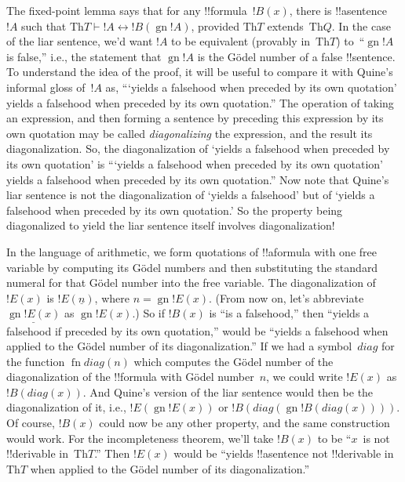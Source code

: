 \documentclass[10pt,a4paper]{article}
\theoremstyle{plain}
\theoremstyle{definition}
\theoremstyle{remark}
\newenvironment{explain}{}{}
\providecommand{\Proves}{\mathrel{\vdash}}
\providecommand{\Obj}{}
\providecommand{\Th}{\ensuremath{\mathrm{Th}}}
\providecommand{\num}[1]{\underline{#1}}
\providecommand{\Gn}{\operatorname{gn}}
\providecommand{\gn}{\operatorname{gn}}
\providecommand{\liff}{\mathbin{\leftrightarrow}}
\providecommand{\fn}{\operatorname{fn}}
\providecommand{\fn}{\operatorname{fn}}
\begin{document}
\begin{explain}
The fixed-point lemma says that for any !!{formula}~$!B(x)$, there is
!!a{sentence}~$!A$ such that $\Th{T} \Proves !A \liff !B(\gn{!A})$,
provided $\Th{T}$ extends~$\Th{Q}$.  In the case of the liar sentence,
we'd want $!A$ to be equivalent (provably in~$\Th{T}$) to~``$\gn{!A}$
is false,'' i.e., the statement that $\Gn{!A}$ is the G\"odel number
of a false !!{sentence}. To understand the idea of the proof, it will
be useful to compare it with Quine's informal gloss of~$!A$ as,
``{}`yields a falsehood when preceded by its own quotation' yields a
falsehood when preceded by its own quotation.''  The operation of
taking an expression, and then forming a sentence by preceding this
expression by its own quotation may be called \emph{diagonalizing} the
expression, and the result its diagonalization. So, the
diagonalization of `yields a falsehood when preceded by its own
quotation' is ``{}`yields a falsehood when preceded by its own
quotation' yields a falsehood when preceded by its own quotation.''
Now note that Quine's liar sentence is not the diagonalization of
`yields a falsehood' but of `yields a falsehood when preceded by its
own quotation.' So the property being diagonalized to yield the liar
sentence itself involves diagonalization!{}

In the language of arithmetic, we form quotations of !!a{formula} with
one free variable by computing its G\"odel numbers and then
substituting the standard numeral for that G\"odel number into the
free variable. The diagonalization of~$!E(x)$ is $!E(\num{n})$, where
$n = \Gn{!E(x)}$. (From now on, let's abbreviate $\num{\Gn{!E(x)}}$ as
$\gn{!E(x)}$.)  So if $!B(x)$ is ``is a falsehood,'' then ``yields a
falsehood if preceded by its own quotation,'' would be ``yields a
falsehood when applied to the G\"odel number of its diagonalization.''
If we had a symbol~$\Obj{diag}$ for the function $\fn{diag}(n)$ which
computes the G\"odel number of the diagonalization of the !!{formula}
with G\"odel number~$n$, we could write $!E(x)$ as
$!B(\Obj{diag}(x))$. And Quine's version of the liar sentence would
then be the diagonalization of it, i.e., $!E(\gn{!E(x)})$ or
$!B(\Obj{diag}(\gn{!B(\Obj{diag}(x))}))$.  Of course, $!B(x)$ could
now be any other property, and the same construction would work. For
the incompleteness theorem, we'll take $!B(x)$ to be ``$x$~is not
!!{derivable} in~$\Th{T}$.'' Then $!E(x)$ would be ``yields
!!a{sentence} not !!{derivable} in~$\Th{T}$ when applied to the
G\"odel number of its diagonalization.''


\end{explain}
\end{document}
